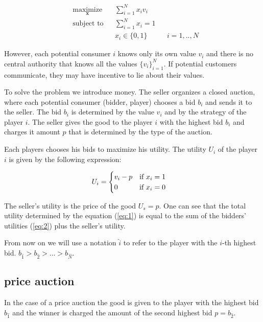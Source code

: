\begin{equation}\label{eq:1}
\begin{aligned}
& \underset{\mathbf{x}}{\text{maximize}} 
	& & \sum_{i=1}^N x_i v_i \\
& \text{subject to}
	& & \sum_{i=1}^N x_i = 1 \\
	& & & x_i \in \{0, 1\}
	& & i = 1,..,N
\end{aligned}
\end{equation}

However, each potential consumer $i$ knows only its own value $v_i$ and there is no central authority that knows all the values $\{v_i\}_{i=1}^N$. If potential customers communicate, they may have incentive to lie about their values.

To solve the problem we introduce money. The seller organizes a closed auction, where each potential consumer (bidder, player) chooses a bid $b_i$ and sends it to the seller. The bid $b_i$ is determined by the value $v_i$ and by the strategy of the player $i$. The seller gives the good to the player $i$ with the highest bid $b_i$ and charges it amount $p$ that is determined by the type of the auction. 

Each players chooses his bids to maximize his utility. The utility $U_i$ of the player $i$ is given by the following expression:

\begin{equation}\label{eq:2}
\begin{aligned}
& U_i = 
	\begin{cases}
	v_i - p \hfill & \text{if } x_i = 1\\
	0 \hfill & \text{if } x_i = 0
	\end{cases}
\end{aligned}
\end{equation}

The seller's utility is the price of the good $U_s = p$. One can see that the total utility determined by the equation (\ref{eq:1}) is equal to the sum of the bidders' utilities (\ref{eq:2}) plus the seller's utility.

From now on we will use a notation $\hat i$ to refer to the player with the $i$-th highest bid. $b_{\hat1} > b_{\hat2} > ... > b_{\hat N}$.

\subsection{ price auction}

In the case of a  price auction the good is given to the player with the highest bid $b_{\hat1}$ and the winner is charged the amount of the second highest bid $p = b_{\hat2}$.

